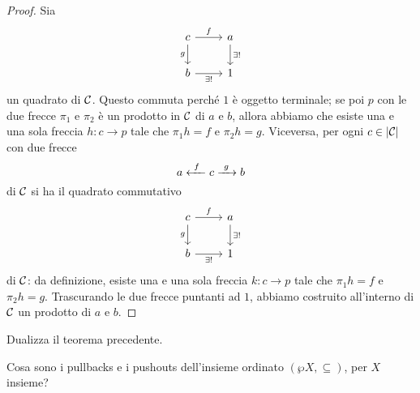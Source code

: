 \begin{proof}
Sia
\[\begin{tikzcd}
c \ar["f", r] \ar["g", swap, d] & a \ar["\exists!", d] \\
b \ar["\exists!", swap, r]              & 1
\end{tikzcd}\]
un quadrato di \(\mathcal C\). Questo commuta perché \(1\) è oggetto terminale; se poi \(p\) con le due frecce \(\pi_1\) e \(\pi_2\) è un prodotto in \(\mathcal C\) di \(a\) e \(b\), allora abbiamo che esiste una e una sola freccia \(h : c \to p\) tale che \(\pi_1h = f\) e \(\pi_2h = g\).\newline
Viceversa, per ogni \(c \in \lvert\mathcal C\rvert\) con due frecce
\[a \xleftarrow{\ f\ } c \xrightarrow{\ g\ } b\]
di \(\mathcal C\) si ha il quadrato commutativo
\[\begin{tikzcd}
c \ar["f", r] \ar["g", swap, d] & a \ar["\exists!", d] \\
b \ar["\exists!", swap, r]              & 1
\end{tikzcd}\]
di \(\mathcal C\): da definizione, esiste una e una sola freccia \(k : c \to p\) tale che \(\pi_1h = f\) e \(\pi_2h = g\). Trascurando le due frecce puntanti ad \(1\), abbiamo costruito all'interno di \(\mathcal C\) un prodotto di \(a\) e \(b\).
\end{proof}

\begin{esercizio}
Dualizza il teorema precedente.
\end{esercizio}

\begin{esercizio}
Cosa sono i pullbacks e i pushouts dell'insieme ordinato \((\wp X, \subseteq)\), per \(X\) insieme?
\end{esercizio}
